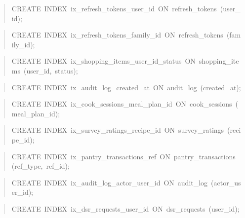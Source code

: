 \begin{quote}\scriptsize\ttfamily\raggedright
CREATE\ INDEX\ ix\_\allowbreak{}refresh\_\allowbreak{}tokens\_\allowbreak{}user\_\allowbreak{}id\ ON\ refresh\_\allowbreak{}tokens\ (user\_\allowbreak{}id);
\end{quote}
\begin{quote}\scriptsize\ttfamily\raggedright
CREATE\ INDEX\ ix\_\allowbreak{}refresh\_\allowbreak{}tokens\_\allowbreak{}family\_\allowbreak{}id\ ON\ refresh\_\allowbreak{}tokens\ (family\_\allowbreak{}id);
\end{quote}
\begin{quote}\scriptsize\ttfamily\raggedright
CREATE\ INDEX\ ix\_\allowbreak{}shopping\_\allowbreak{}items\_\allowbreak{}user\_\allowbreak{}id\_\allowbreak{}status\ ON\ shopping\_\allowbreak{}items\ (user\_\allowbreak{}id,\ status);
\end{quote}
\begin{quote}\scriptsize\ttfamily\raggedright
CREATE\ INDEX\ ix\_\allowbreak{}audit\_\allowbreak{}log\_\allowbreak{}created\_\allowbreak{}at\ ON\ audit\_\allowbreak{}log\ (created\_\allowbreak{}at);
\end{quote}
\begin{quote}\scriptsize\ttfamily\raggedright
CREATE\ INDEX\ ix\_\allowbreak{}cook\_\allowbreak{}sessions\_\allowbreak{}meal\_\allowbreak{}plan\_\allowbreak{}id\ ON\ cook\_\allowbreak{}sessions\ (meal\_\allowbreak{}plan\_\allowbreak{}id);
\end{quote}
\begin{quote}\scriptsize\ttfamily\raggedright
CREATE\ INDEX\ ix\_\allowbreak{}survey\_\allowbreak{}ratings\_\allowbreak{}recipe\_\allowbreak{}id\ ON\ survey\_\allowbreak{}ratings\ (recipe\_\allowbreak{}id);
\end{quote}
\begin{quote}\scriptsize\ttfamily\raggedright
CREATE\ INDEX\ ix\_\allowbreak{}pantry\_\allowbreak{}transactions\_\allowbreak{}ref\ ON\ pantry\_\allowbreak{}transactions\ (ref\_\allowbreak{}type,\ ref\_\allowbreak{}id);
\end{quote}
\begin{quote}\scriptsize\ttfamily\raggedright
CREATE\ INDEX\ ix\_\allowbreak{}audit\_\allowbreak{}log\_\allowbreak{}actor\_\allowbreak{}user\_\allowbreak{}id\ ON\ audit\_\allowbreak{}log\ (actor\_\allowbreak{}user\_\allowbreak{}id);
\end{quote}
\begin{quote}\scriptsize\ttfamily\raggedright
CREATE\ INDEX\ ix\_\allowbreak{}dsr\_\allowbreak{}requests\_\allowbreak{}user\_\allowbreak{}id\ ON\ dsr\_\allowbreak{}requests\ (user\_\allowbreak{}id);
\end{quote}
